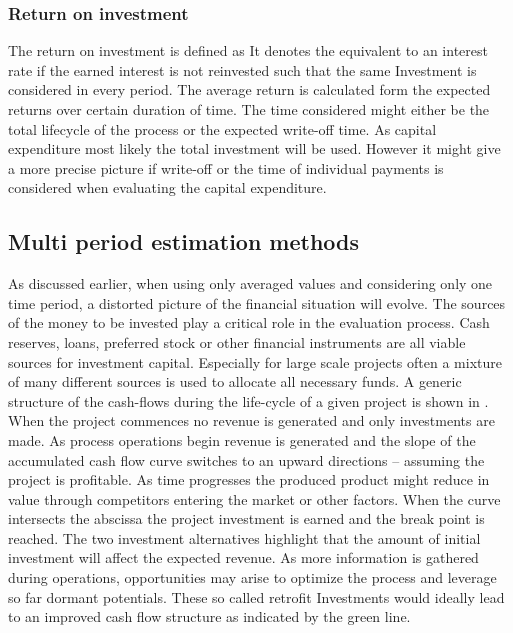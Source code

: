         \subsubsection{Return on investment}
            The return on investment is defined as
            It denotes the equivalent to an interest rate if the earned interest is not reinvested such that the same
            Investment is considered in every period. The average return is calculated form the expected returns
            over certain duration of time. The time considered might either be the total lifecycle of the process or
            the expected write-off time. As capital expenditure most likely the total investment will be used. However
            it might give a more precise picture if write-off or the time of individual payments is considered when
            evaluating the capital expenditure.

    \subsection{Multi period estimation methods}
    \label{sec:MultiPeriod}
        As discussed earlier, when using only averaged values and considering only one time period,
        a distorted picture of the financial situation will evolve. The sources of the money to be invested
        play a critical role in the evaluation process. Cash reserves, loans, preferred stock or other financial
        instruments are all viable sources for investment capital. Especially for large scale projects often a
        mixture of many different sources is used to allocate all necessary funds. A generic structure of the
        cash-flows during the life-cycle of a given project is shown in . When the project
        commences no revenue is generated and only investments are made. As process operations begin revenue
        is generated and  the slope of the accumulated cash flow curve switches to an upward directions
        -- assuming the project is profitable. As time progresses the produced product might reduce in value
        through competitors entering the market or other factors. When the curve intersects the abscissa the
        project investment is earned and the break point is reached. The two investment alternatives highlight
        that the amount of initial investment will affect the expected revenue. As more information is gathered
        during operations, opportunities may arise to optimize the process and leverage so far dormant potentials.
        These so called retrofit Investments would ideally lead to an improved cash flow structure as indicated
        by the green line.

